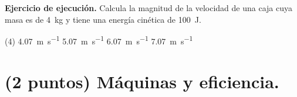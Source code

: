 \documentclass[12pt, letter]{exam}
\begin{document}
\begin{questions}
    \question \label{Ejercicio_12} \textbf{Ejercicio de ejecución. } Calcula la magnitud de la velocidad de una caja cuya masa es de \SI{4}{\kilo\gram} y tiene una energía cinética de \SI{100}{\joule}.
    \begin{tasks}(4)
        \task \SI{4.07}{\meter\per\second}
        \task \SI{5.07}{\meter\per\second}
        \task \SI{6.07}{\meter\per\second}
        \task \SI{7.07}{\meter\per\second}
    \end{tasks}

    \section{(2 puntos) Máquinas y eficiencia.}

    

\end{questions}
\end{document}
